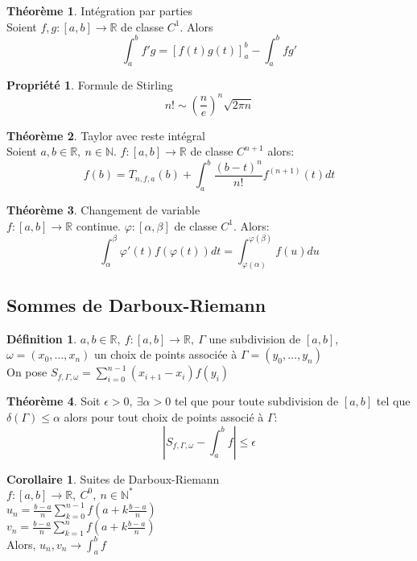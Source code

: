 \documentclass[fleqn]{article}
\theoremstyle{definition} \newtheorem*{defi}{D\'efinition}
\theoremstyle{definition} \newtheorem*{theo}{Th\'eor\`eme}
\theoremstyle{definition} \newtheorem*{coro}{Corollaire}
\theoremstyle{remark} \newtheorem*{rqs}{Remarques}
\theoremstyle{definition} \newtheorem*{prop}{Propri\'et\'e}
\begin{document}
\begin{theo} Int\'egration par parties \\
	Soient $f,g: [a,b] \rightarrow \mathbb{R}$ de classe $C^1$. Alors
	\[\int_a^b f'g = [f(t)g(t)]_a^b - \int_a^b fg'\]
\end{theo}

\begin{prop} Formule de Stirling
	\[n! \sim (\frac{n}{e})^n \sqrt{2\pi n}\]
\end{prop}

\begin{theo} Taylor avec reste int\'egral \\
	Soient $a,b \in \mathbb{R},\ n \in \mathbb{N}$. $f:[a,b] \rightarrow \mathbb{R}$ de classe $C^{n+1}$ alors:
	\[f(b) = T_{n,f,a}(b) + \int_a^b \frac{(b-t)^n}{n!} f^{(n+1)} (t)dt\]
\end{theo}

\begin{theo} Changement de variable \\
	$f:[a,b] \rightarrow \mathbb{R}$ continue. $\varphi:[\alpha, \beta]$ de classe $C^1$. Alors:
	\[\int_\alpha^\beta \varphi '(t) f(\varphi(t)) dt = \int_{\varphi(\alpha)}^{\varphi(\beta)} f(u)du\]
\end{theo}

\subsection{Sommes de Darboux-Riemann}
\begin{defi}
	$a,b \in \mathbb{R},\ f:[a,b] \rightarrow \mathbb{R},\ \Gamma$ une subdivision de $[a,b]$, $\omega = (x_0, \hdots, x_n)$ un choix de
	points associ\'ee \`a $\Gamma = (y_0, \hdots, y_n)$ \\
	On pose $S_{f,\Gamma, \omega} = \sum_{i=0}^{n-1} (x_{i+1} - x_i) f(y_i)$
\end{defi}
\begin{theo}
	Soit $\epsilon > 0,\ \exists \alpha > 0$ tel que pour toute subdivision de $[a,b]$ tel que $\delta(\Gamma) \leq \alpha$ alors
	pour tout choix de points associ\'e \`a $\Gamma$:
	\[|S_{f,\Gamma, \omega} - \int_a^b f| \leq \epsilon\]
\end{theo}

\begin{coro} Suites de Darboux-Riemann \\
	$f:[a,b] \rightarrow \mathbb{R},\ C^0,\ n \in \mathbb{N}^*$ \\
	$u_n = \frac{b-a}{n} \sum_{k= 0}^{n-1} f(a + k\frac{b-a}{n})$ \\
	$v_n = \frac{b-a}{n} \sum_{k= 1}^{n} f(a + k\frac{b-a}{n})$ \\
	Alors, $u_n, v_n \rightarrow \int_a^b f$
\end{coro}
\end{document}

